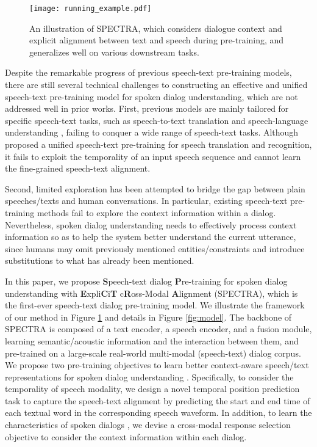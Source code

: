 \documentclass[11pt]{article}
\begin{document}
\begin{figure}[t]
    \centering
    \texttt{[image: running\_example.pdf]}
    \caption{An illustration of SPECTRA, which considers dialogue context and explicit alignment between text and speech during pre-training, and generalizes well on various downstream tasks.}
    \label{fig:running_example}
\end{figure}



Despite the remarkable progress of previous speech-text pre-training models, there are still several technical challenges to constructing an effective and unified speech-text pre-training model for spoken dialog understanding, which are not addressed well in prior works.
First, previous models are mainly tailored for specific speech-text tasks, such as speech-to-text translation \cite{liu2020multilingual} and speech-language understanding \cite{chung2020splat}, failing to conquer a wide range of speech-text tasks. Although \citet{tang2022unified} proposed a unified speech-text pre-training for speech translation and recognition, it fails to exploit the temporality of an input speech sequence and cannot learn the fine-grained speech-text alignment. 

Second, limited exploration has been attempted to bridge the gap between plain speeches/texts and human conversations. In particular, existing speech-text pre-training methods fail to explore the context information within a dialog. Nevertheless, spoken dialog understanding needs to effectively process context information so as to help the system better understand the current utterance, since humans may omit previously mentioned entities/constraints and introduce substitutions to what has already been mentioned. 







In this paper, we propose \textbf{S}peech-text dialog \textbf{P}re-training for spoken dialog understanding with \textbf{E}xpli\textbf{C}i\textbf{T} c\textbf{R}oss-Modal \textbf{A}lignment (SPECTRA), which is the first-ever speech-text dialog pre-training model. 
We illustrate the framework of our method in Figure \ref{fig:running_example} and details in Figure \ref{fig:model}.
The backbone of SPECTRA is composed of a text encoder, a speech encoder, and a fusion module, learning semantic/acoustic information and the interaction between them, and pre-trained on a large-scale real-world multi-modal (speech-text) dialog corpus. We propose two pre-training objectives to learn better context-aware speech/text representations for spoken dialog understanding \cite{dai2022cgodial, zhang-etal-2022-slot}. Specifically, to consider the temporality of speech modality, we design a novel temporal position prediction task to capture the speech-text alignment by predicting the start and end time of each textual word in the corresponding speech waveform. In addition, to learn the characteristics of spoken dialogs \cite{gao2023unsupervised, qian2023empathetic}, we devise a cross-modal response selection objective to consider the context information within each dialog. 
\end{document}
